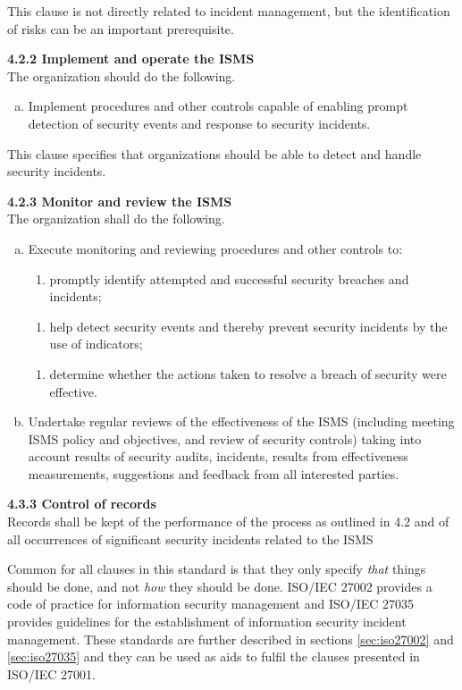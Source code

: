 This clause is not directly related to incident management, but the identification of risks can be an important prerequisite. %

\textbf{4.2.2 Implement and operate the \ac{ISMS}} \\
The organization should do the following.
\begin{enumerate}[h)]
\item Implement procedures and other controls capable of enabling prompt detection of security events and response to security incidents.
\end{enumerate}

This clause specifies that organizations should be able to detect and handle security incidents.

\textbf{4.2.3 Monitor and review the ISMS}\\
The organization shall do the following.
\begin{enumerate}[a)]
\item Execute monitoring and reviewing procedures and other controls to:
\begin{enumerate}[2)]
\item promptly identify attempted and successful security breaches and incidents;
\end{enumerate}
\vspace{-0.2cm}
\begin{enumerate}[4)]
\item help detect security events and thereby prevent security incidents by the use of indicators;
\end{enumerate}
\vspace{-0.2cm}
\begin{enumerate}[5)]
\item determine whether the actions taken to resolve a breach of security were effective.
\end{enumerate}
\item Undertake regular reviews of the effectiveness of the \ac{ISMS} (including meeting \ac{ISMS} policy and objectives, and review of security controls) taking into account results of security audits, incidents, results from effectiveness measurements, suggestions and feedback from all interested parties.
\end{enumerate}

\textbf{4.3.3 Control of records}\\
Records shall be kept of the performance of the process as outlined in 4.2 and of all occurrences of significant security incidents related to the \ac{ISMS}

Common for all clauses in this standard is that they only specify \textit{that} things should be done, and not \textit{how} they should be done. \acs{ISO}/\acs{IEC} 27002 provides a code of practice for information security management and \acs{ISO}/\acs{IEC} 27035 provides guidelines for the establishment of information security incident management. These standards are further described in sections \ref{sec:iso27002} and \ref{sec:iso27035} and they can be used as aids to fulfil the clauses presented in \acs{ISO}/\acs{IEC} 27001.